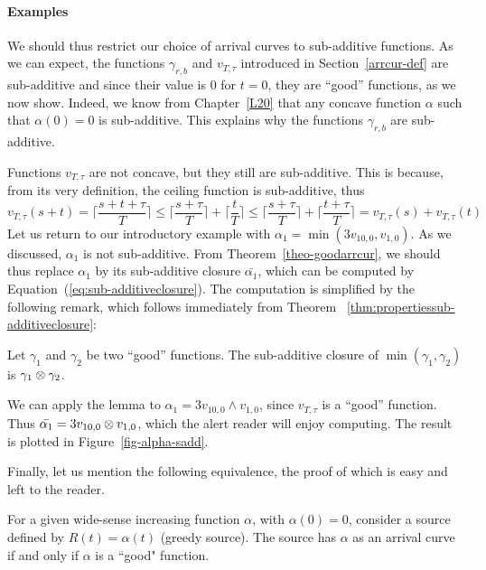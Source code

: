 \paragraph{Examples}

We should thus restrict our choice of arrival curves to
sub-additive functions.  As we can expect, the functions
$\gamma_{r,b}$ and $v_{T, \tau}$ introduced in
Section~\ref{arrcur-def} are sub-additive and since their value is
$0$ for $t=0$, they are ``good'' functions, as we now show.
Indeed, we know from Chapter~\ref{L20} that any concave function
$\alpha$ such that $\alpha(0)=0$ is sub-additive.  This explains
why the functions $\gamma_{r,b}$ are sub-additive.

Functions $v_{T, \tau}$ are not concave, but they still are
sub-additive. This is because, from its very definition, the
ceiling function is sub-additive, thus $$v_{T, \tau}(s+t)=\lceil
\frac{s+t+\tau}{T} \rceil \leq  \lceil \frac{s+\tau}{T} \rceil +
\lceil \frac{t}{T} \rceil \leq \lceil \frac{s+\tau}{T} \rceil +
\lceil \frac{t + \tau}{T} \rceil = v_{T, \tau}(s) + v_{T, \tau}(t)
$$ Let us return to our introductory example with $\alpha_{1}=
\min(3v_{10,0}, v_{1,0})$.  As we discussed, $\alpha_{1}$ is not
sub-additive.  From Theorem~\ref{theo-goodarrcur}, we should thus
replace $\alpha_{1}$ by its sub-additive closure
$\bar{\alpha_{1}}$, which can be computed by
Equation~(\ref{eq:sub-additiveclosure}). The computation is
simplified by the following remark, which follows immediately from
Theorem ~\ref{thm:propertiessub-additiveclosure}:
\begin{lemma}
    Let $\gamma_{1}$ and
$\gamma_{2}$ be two ``good'' functions. The sub-additive closure of
$\min (\gamma_{1},\gamma_{2}) $ is
$\gamma_{1} \otimes \gamma_{2}$.
\end{lemma}
We can apply the lemma to $\alpha_{1}= 3v_{10,0} \wedge v_{1,0}$,
since $v_{T, \tau}$ is a ``good'' function. Thus
$\bar{\alpha_{1}}= 3v_{10,0}\otimes v_{1,0}$, which the alert reader
will enjoy computing. The result is plotted in
Figure~\ref{fig-alpha-sadd}.

Finally, let us mention the following equivalence, the proof of
which is easy and left to the reader.

\begin{proposition}
 For a given wide-sense increasing function
$\alpha$, with $\alpha(0)=0$, consider a source defined by
$R(t)=\alpha(t)$ (greedy source). The source has $\alpha$ as an arrival curve if and only if $\alpha$ is a ``good" function.%
\end{proposition}


